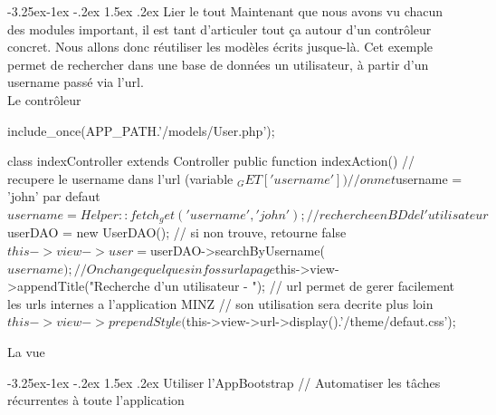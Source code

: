 \documentclass[a4paper,11pt]{article}
\makeatletter
\renewcommand{\subsection}{\@startsection{subsection}{2}{\z@}%
             {-3.25ex\@plus -1ex \@minus -.2ex}%
             {1.5ex \@plus .2ex}%
             {\color{bleuFonce}\normalfont\large\bfseries}}
\makeatother
\begin{document}
\subsection{Lier le tout}
Maintenant que nous avons vu chacun des modules important, il est tant d'articuler tout ça autour d'un contrôleur concret. Nous allons donc réutiliser les modèles écrits jusque-là. Cet exemple permet de rechercher dans une base de données un utilisateur, à partir d'un username passé via l'url.\\

Le contrôleur
\begin{PHP}
include_once(APP_PATH.'/models/User.php');

class indexController extends Controller {
  public function indexAction() {
    // recupere le username dans l'url (variable $_GET['username'])
    // on met $username = 'john' par defaut
    $username = Helper::fetch_get('username', 'john');
  
    // recherche en BD de l'utilisateur
    $userDAO = new UserDAO();
    // si non trouve, retourne false
    $this->view->user = $userDAO->searchByUsername($username);
    
    // On change quelques infos sur la page
    $this->view->appendTitle("Recherche d'un utilisateur - ");
    // url permet de gerer facilement les urls internes a l'application MINZ
    // son utilisation sera decrite plus loin
    $this->view->prependStyle($this->view->url->display().'/theme/defaut.css');
  }
}
\end{PHP}

La vue



\subsection{Utiliser l'AppBootstrap}
// Automatiser les tâches récurrentes à toute l'application
\end{document}
